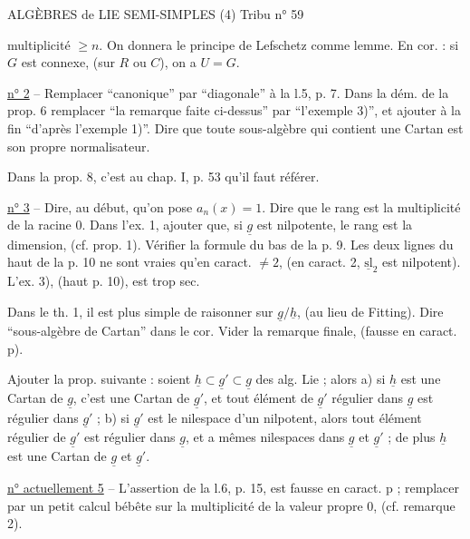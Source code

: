 
ALGÈBRES de LIE SEMI-SIMPLES (4) \hfill Tribu n° 59

multiplicité $\geq n$. On donnera le principe de Lefschetz comme lemme. En cor. : si $G$ est connexe, (sur $R$ ou $C$), on a $U=G$.

\uline{n° 2} -- Remplacer ``canonique'' par ``diagonale'' à la l.5, p. 7. Dans la dém. de la prop. 6 remplacer ``la remarque faite ci-dessus'' par ``l'exemple 3)'', et ajouter à la fin ``d'après l'exemple 1)''. Dire que toute sous-algèbre qui contient une Cartan est son propre normalisateur.

Dans la prop. 8, c'est au chap. I, p. 53 qu'il faut référer.

\uline{n° 3} -- Dire, au début, qu'on pose $a_n(x)=1$. Dire que le rang est la multiplicité de la racine 0. Dans l'ex. 1, ajouter que, si $\underline{g}$ est nilpotente, le rang est la dimension, (cf. prop. 1). Vérifier la formule du bas de la p. 9. Les deux lignes du haut de la p. 10 ne sont vraies qu'en caract. $\neq 2$, (en caract. 2, $\underline{\mathrm{sl}}_2$ est nilpotent). L'ex. 3), (haut p. 10), est trop sec.

Dans le th. 1, il est plus simple de raisonner sur $\underline{g}/\underline{h}$, (au lieu de Fitting). Dire ``sous-algèbre de Cartan'' dans le cor. Vider la remarque finale, (fausse en caract. p).

Ajouter la prop. suivante : soient $\underline{h}\subset\underline{g}'\subset\underline{g}$ des alg. Lie ; alors a) si $\underline{h}$ est une Cartan de $\underline{g}$, c'est une Cartan de $\underline{g}'$, et tout élément de $\underline{g}'$ régulier dans $\underline{g}$ est régulier dans $\underline{g}'$ ; b) si $\underline{g}'$ est le nilespace d'un nilpotent, alors tout élément régulier de $\underline{g}'$ est régulier dans $\underline{g}$, et a mêmes nilespaces dans $\underline{g}$ et $\underline{g}'$ ; de plus $\underline{h}$ est une Cartan de $\underline{g}$ et $\underline{g}'$.

\uline{n° actuellement 5} -- L'assertion de la l.6, p. 15, est fausse en caract. p ; remplacer par un petit calcul bébête sur la multiplicité de la valeur propre 0, (cf. remarque 2).
